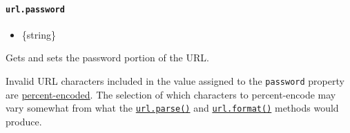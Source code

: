 \begin{Shaded}
\begin{Highlighting}[]
\OperatorTok{=}  \NormalTok{(}\NormalTok{)}\OperatorTok{;}
\NormalTok{)}\OperatorTok{;}

\NormalTok{)}\OperatorTok{;}
\end{Highlighting}
\end{Shaded}

\paragraph{\texorpdfstring{\texttt{url.password}}{url.password}}\label{url.password}

\begin{itemize}
\tightlist
\item
  \{string\}
\end{itemize}

Gets and sets the password portion of the URL.

\begin{Shaded}
\begin{Highlighting}[]
\OperatorTok{=}  \NormalTok{(}\NormalTok{)}\OperatorTok{;}
\NormalTok{)}\OperatorTok{;}

 \OperatorTok{=} \StringTok{\textquotesingle{}123\textquotesingle{}}\OperatorTok{;}
\NormalTok{)}\OperatorTok{;}
\end{Highlighting}
\end{Shaded}

Invalid URL characters included in the value assigned to the
\texttt{password} property are
\hyperref[percent-encoding-in-urls]{percent-encoded}. The selection of
which characters to percent-encode may vary somewhat from what the
\hyperref[urlparseurlstring-parsequerystring-slashesdenotehost]{\texttt{url.parse()}}
and \hyperref[urlformaturlobject]{\texttt{url.format()}} methods would
produce.

